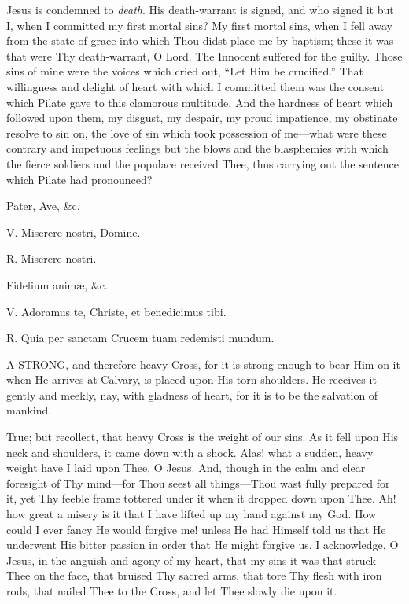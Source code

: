 Jesus is condemned to \emph{death}.
His death-warrant is signed, and who signed it but I, when I committed
my first mortal sins? My first mortal sins, when I fell away from the
state of grace into which Thou didst place me by baptism; these it was
that were Thy death-warrant, O Lord. The Innocent suffered for the
guilty. Those sins of mine were the voices which cried out, ``Let Him be
crucified.'' That willingness and delight of heart with which I committed
them was the consent which Pilate gave to this clamorous
multitude. And the hardness of heart which followed upon them, my
disgust, my despair, my proud impatience, my obstinate resolve to sin
on, the love of sin which took possession of me—what were these
contrary and impetuous feelings but the blows and the blasphemies with
which the fierce soldiers and the populace received Thee, thus carrying
out the sentence which Pilate had pronounced?

Pater, Ave, \&c.

V. Miserere nostri, Domine.

R. Miserere nostri.

Fidelium animæ, \&c.


V. Adoramus te, Christe, et
benedicimus tibi.

R. Quia per sanctam Crucem tuam redemisti mundum.

A STRONG, and
therefore heavy Cross, for it is strong enough to bear Him on it when He
arrives at Calvary, is placed upon His torn shoulders. He receives it
gently and meekly, nay, with gladness of heart, for it is to be the
salvation of mankind.

True; but recollect, that heavy
Cross is the weight of our sins. As it fell upon His neck and shoulders,
it came down with a shock. Alas! what a sudden, heavy weight have I laid
upon Thee, O Jesus. And, though in the calm and clear foresight of Thy
mind—for Thou seest all things—Thou wast fully prepared for it, yet
Thy feeble frame tottered under it when it dropped down upon Thee. Ah!
how great a misery is it that I have lifted up my hand against my God.
How could I ever fancy He would forgive me! unless He had Himself told
us that He underwent His bitter passion in order that He might forgive
us. I acknowledge, O Jesus, in the anguish and agony of my heart, that
my sins it was that struck Thee on the face, that bruised Thy sacred
arms, that tore Thy flesh with iron rods, that nailed Thee to the Cross,
and let Thee slowly die upon it.

